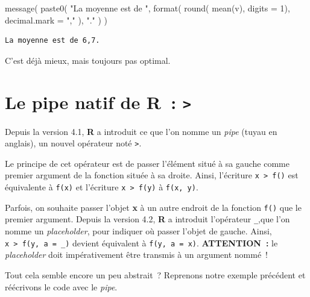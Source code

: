\documentclass[
  letterpaper,
  DIV=11,
  numbers=noendperiod,
  oneside]{scrreprt}
\newenvironment{Shaded}{\begin{snugshade}}{\end{snugshade}}
\newcommand{\AttributeTok}[1]{\textcolor[rgb]{0.40,0.45,0.13}{#1}}
\newcommand{\DecValTok}[1]{\textcolor[rgb]{0.68,0.00,0.00}{#1}}
\newcommand{\FunctionTok}[1]{\textcolor[rgb]{0.28,0.35,0.67}{#1}}
\newcommand{\NormalTok}[1]{\textcolor[rgb]{0.00,0.23,0.31}{#1}}
\newcommand{\StringTok}[1]{\textcolor[rgb]{0.13,0.47,0.30}{#1}}
\begin{document}
\begin{Shaded}
\begin{Highlighting}[]
\FunctionTok{message}\NormalTok{(}
  \FunctionTok{paste0}\NormalTok{(}
    \StringTok{"La moyenne est de "}\NormalTok{, }
    \FunctionTok{format}\NormalTok{(}
      \FunctionTok{round}\NormalTok{(}
        \FunctionTok{mean}\NormalTok{(v), }
        \AttributeTok{digits =} \DecValTok{1}\NormalTok{), }
      \AttributeTok{decimal.mark =} \StringTok{","}
\NormalTok{    ),}
    \StringTok{"."}
\NormalTok{  )}
\NormalTok{)}
\end{Highlighting}
\end{Shaded}

\begin{verbatim}
La moyenne est de 6,7.
\end{verbatim}

C'est déjà mieux, mais toujours pas optimal.

\hypertarget{le-pipe-natif-de-r}{%
\section{\texorpdfstring{Le pipe natif de R~:
\texttt{\textbar{}\textgreater{}}}{Le pipe natif de R~: \textbar\textgreater{}}}\label{le-pipe-natif-de-r}}

Depuis la version 4.1, \textbf{R} a introduit ce que l'on nomme un
\emph{pipe} (tuyau en anglais), un nouvel opérateur noté
\texttt{\textbar{}\textgreater{}}.

Le principe de cet opérateur est de passer l'élément situé à sa gauche
comme premier argument de la fonction située à sa droite. Ainsi,
l'écriture \texttt{x\ \textbar{}\textgreater{}\ f()} est équivalente à
\texttt{f(x)} et l'écriture \texttt{x\ \textbar{}\textgreater{}\ f(y)} à
\texttt{f(x,\ y)}.

Parfois, on souhaite passer l'objet \textbf{x} à un autre endroit de la
fonction \texttt{f()} que le premier argument. Depuis la version 4.2,
\textbf{R} a introduit l'opérateur \texttt{\_},que l'on nomme un
\emph{placeholder}, pour indiquer où passer l'objet de gauche. Ainsi,
\texttt{x\ \textbar{}\textgreater{}\ f(y,\ a\ =\ \_)} devient équivalent
à \texttt{f(y,\ a\ =\ x)}. \textbf{ATTENTION~:} le \emph{placeholder}
doit impérativement être transmis à un argument nommé~!

Tout cela semble encore un peu abstrait~? Reprenons notre exemple
précédent et réécrivons le code avec le \emph{pipe}.
\end{document}
